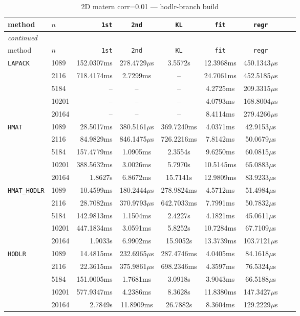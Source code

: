\documentclass[11pt,a4paper]{article}
\begin{document}
\begin{center}
\begin{longtable}{llrcccccc}
\caption{2D matern corr=0.01 --- hodlr-branch build}
\\\toprule
method & $n$ & \texttt{1st} & \texttt{2nd} & \texttt{KL} & \texttt{fit} & \texttt{regr}\\
\midrule
\endfirsthead
\multicolumn{8}{l}{\small\emph{continued}}\\
\toprule
method & $n$ & \texttt{1st} & \texttt{2nd} & \texttt{KL} & \texttt{fit} & \texttt{regr}\\
\midrule
\endhead

\texttt{LAPACK} & 1089 & 152.0307ms & 278.4729$\mu$s & 3.5572s & 12.3968ms & 450.1343$\mu$s\\
 & 2116 & 718.4174ms & 2.7299ms & -- & 24.7061ms & 452.5185$\mu$s\\
 & 5184 & -- & -- & -- & 4.2725ms & 209.3315$\mu$s\\
 & 10201 & -- & -- & -- & 4.0793ms & 168.8004$\mu$s\\
 & 20164 & -- & -- & -- & 8.4114ms & 279.4266$\mu$s\\
\texttt{HMAT} & 1089 & 28.5017ms & 380.5161$\mu$s & 369.7240ms & 4.0371ms & 42.9153$\mu$s\\
 & 2116 & 84.9829ms & 846.1475$\mu$s & 726.2216ms & 7.8142ms & 50.0679$\mu$s\\
 & 5184 & 157.4779ms & 1.0905ms & 2.3554s & 9.6250ms & 60.0815$\mu$s\\
 & 10201 & 388.5632ms & 3.0026ms & 5.7970s & 10.5145ms & 65.0883$\mu$s\\
 & 20164 & 1.8627s & 6.8672ms & 15.7141s & 12.9809ms & 83.9233$\mu$s\\
\texttt{HMAT\_HODLR} & 1089 & 10.4599ms & 180.2444$\mu$s & 278.9824ms & 4.5712ms & 51.4984$\mu$s\\
 & 2116 & 28.7082ms & 370.9793$\mu$s & 642.7033ms & 7.7991ms & 50.7832$\mu$s\\
 & 5184 & 142.9813ms & 1.1504ms & 2.4227s & 4.1821ms & 45.0611$\mu$s\\
 & 10201 & 447.1834ms & 3.0591ms & 5.8252s & 10.7284ms & 67.7109$\mu$s\\
 & 20164 & 1.9033s & 6.9902ms & 15.9052s & 13.3739ms & 103.7121$\mu$s\\
\texttt{HODLR} & 1089 & 14.4815ms & 232.6965$\mu$s & 287.4746ms & 4.0405ms & 84.1618$\mu$s\\
 & 2116 & 22.3615ms & 375.9861$\mu$s & 698.2346ms & 4.3597ms & 76.5324$\mu$s\\
 & 5184 & 151.0005ms & 1.7681ms & 3.0918s & 3.9043ms & 66.5188$\mu$s\\
 & 10201 & 577.9347ms & 4.2386ms & 8.3628s & 11.8380ms & 147.3427$\mu$s\\
 & 20164 & 2.7849s & 11.8909ms & 26.7882s & 8.3604ms & 129.2229$\mu$s\\
\bottomrule\end{longtable}\end{center}
\end{document}

